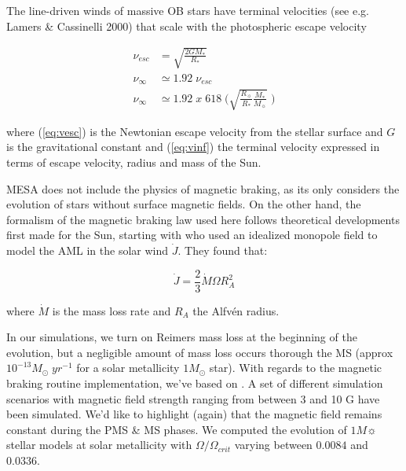 \documentclass[fleqn,usenatbib]{mnras}
\begin{document}
The line-driven winds of massive OB stars have terminal velocities (see e.g. Lamers \& Cassinelli 2000) that scale with the photospheric escape velocity 
\begin{ceqn}
\begin{align}
\nu_{esc} &= \sqrt{\frac{2GM_*}{R_*}} \label{eq:vesc} \\
\nu_\infty &\simeq 1.92 \;\nu_{esc}\\
\nu_\infty &\simeq 1.92 \; x \; 618 \; \Bigg(\sqrt{\frac{R_{\sun}}{R_*}\frac{M_*}{M_{\sun}}} \;\Bigg) \label{eq:vinf}
\end{align}
\end{ceqn}
where (\ref{eq:vesc}) is the Newtonian escape velocity from the stellar surface and $G$ is the gravitational constant and (\ref{eq:vinf}) the terminal velocity expressed in terms of escape velocity, radius and mass of the Sun.\par

MESA does not include the physics of magnetic braking, as its only considers the evolution of stars without surface magnetic fields. On the other hand, the formalism of the magnetic braking law used here follows theoretical developments first made for the Sun, starting with \citet{Weber1967} who used an idealized monopole field to model the AML in the solar wind $\Dot{J}$. They found that:
\begin{ceqn}
\begin{equation}
 \Dot{J} = \frac{2}{3} \Dot{M}\Omega R^{2}_{A} \label{eq:j_dot}
\end{equation}
\end{ceqn}
where $\Dot{M}$ is the mass loss rate and $R_A$ the Alfv\'{e}n radius. \par

In our simulations, we turn on Reimers mass loss at the beginning of the evolution, but a negligible amount of mass loss occurs thorough the MS (approx $10^{-13}M_{\odot} \; yr^{-1}$ for a solar metallicity $1 M_{\odot}$ star). With regards to the magnetic braking routine implementation, we've based on \citet{Ud-Doula2007}. A set of different simulation scenarios with magnetic field strength ranging from between 3 and 10 G have been simulated. We'd like to highlight (again) that the magnetic field remains constant during the PMS \& MS phases. We computed the evolution of $1M\sun$ stellar models at solar metallicity with $\Omega / \Omega_{crit}$ varying between $0.0084$ and $0.0336$.\par
\end{document}
